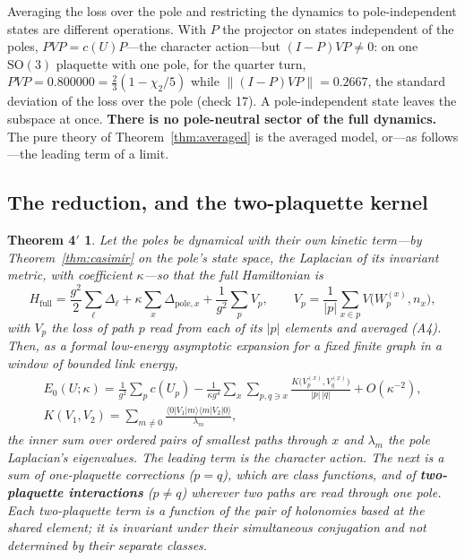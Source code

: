 \documentclass[11pt,a4paper]{article}
\theoremstyle{plain}
\newtheorem*{theorem4p}{Theorem 4$'$}
\theoremstyle{definition}
\theoremstyle{remark}
\newcommand{\SO}{\mathrm{SO}}
\begin{document}
Averaging the loss over the pole and restricting the dynamics to pole-independent states are different operations. With $P$ the projector on states independent of the poles, $PVP=c(U)P$---the character action---but $(I-P)VP\neq0$: on one $\SO(3)$ plaquette with one pole, for the quarter turn, $PVP=0.800000=\tfrac23(1-\chi_2/5)$ while $\|(I-P)VP\|=0.2667$, the standard deviation of the loss over the pole (check 17). A pole-independent state leaves the subspace at once. \textbf{There is no pole-neutral sector of the full dynamics.} The pure theory of Theorem~\ref{thm:averaged} is the averaged model, or---as follows---the leading term of a limit.

\subsection{The reduction, and the two-plaquette kernel}

\begin{theorem4p}
Let the poles be dynamical with their own kinetic term---by Theorem~\ref{thm:casimir} on the pole's state space, the Laplacian of its invariant metric, with coefficient $\kappa$---so that the full Hamiltonian is
\begin{equation}
H_{\mathrm{full}}=\frac{g^2}{2}\sum_\ell\Delta_\ell+\kappa\sum_x\Delta_{\mathrm{pole},x}+\frac{1}{g^2}\sum_pV_p,\qquad V_p=\frac{1}{|p|}\sum_{x\in p}V\big(W_p^{(x)},n_x\big),
\end{equation}
with $V_p$ the loss of path $p$ read from each of its $|p|$ elements and averaged (A4). Then, as a formal low-energy asymptotic expansion for a fixed finite graph in a window of bounded link energy,
\begin{gather}
E_0(U;\kappa)=\frac{1}{g^2}\sum_pc(U_p)-\frac{1}{\kappa g^4}\sum_x\sum_{p,q\ni x}\frac{K\big(V_p^{(x)},V_q^{(x)}\big)}{|p|\,|q|}+O(\kappa^{-2}),\\
K(V_1,V_2)=\sum_{m\neq0}\frac{\langle0|V_1|m\rangle\langle m|V_2|0\rangle}{\lambda_m},\nonumber
\end{gather}
the inner sum over ordered pairs of smallest paths through $x$ and $\lambda_m$ the pole Laplacian's eigenvalues. The leading term is the character action. The next is a sum of one-plaquette corrections ($p=q$), which are class functions, and of \textbf{two-plaquette interactions} ($p\neq q$) wherever two paths are read through one pole. Each two-plaquette term is a function of the pair of holonomies based at the shared element; it is invariant under their simultaneous conjugation and not determined by their separate classes.
\end{theorem4p}
\end{document}
